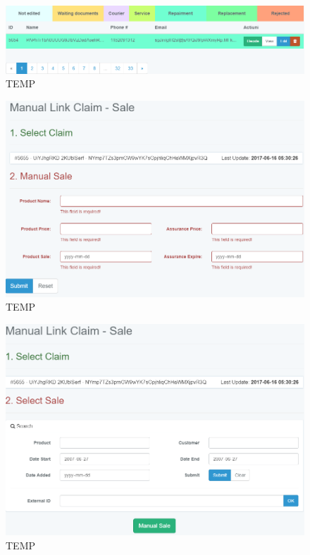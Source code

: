 	\begin{figure}
		\includegraphics[width=\linewidth]{../imagini/claims_filtered.png}
		\caption{TEMP}
		\label{fig:TEMP}
	\end{figure}
	\begin{figure}
		\includegraphics[width=\linewidth]{../imagini/claims_manual_sale.png}
		\caption{TEMP}
		\label{fig:TEMP}
	\end{figure}
	\begin{figure}
		\includegraphics[width=\linewidth]{../imagini/claims_match_sale.png}
		\caption{TEMP}
		\label{fig:TEMP}
	\end{figure}
